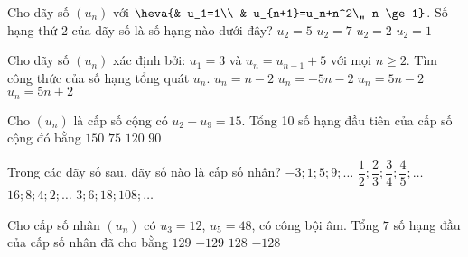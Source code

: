 \begin{ex}%
Cho dãy số $\left(u_n\right)$ với $\heva{& u_1=1\\ & u_{n+1}=u_n+n^2\,, n \ge 1}$. Số hạng thứ $2$ của dãy số là số hạng nào dưới đây?
\choice
{$u_2=5$}
{$u_2=7$}
{\True $u_2=2$}
{$u_2=1$}
\end{ex}

\begin{ex}%
Cho dãy số $(u_n)$ xác định bởi: $u_1=3$ và  $u_n = u_{n-1}+5$ với mọi $n \ge 2.$ Tìm công thức của số hạng tổng quát $u_n.$
\choice
{$u_n = n-2$}
{$u_n = -5n-2$}
{\True $u_n = 5n-2$}
{$u_n = 5n+2$}
\end{ex}

\begin{ex}%
Cho $\left(u_n\right)$ là cấp số cộng có $u_2+u_9=15$. Tổng 10 số hạng đầu tiên của cấp số cộng đó bằng
\choice
{$150$}
{\True $75$}
{$120$}
{$90$}
\end{ex}

\begin{ex}%
Trong các dãy số sau, dãy số nào là cấp số nhân?
\choice
{$-3; 1; 5; 9; \ldots$}
{$\dfrac{1}{2}; \dfrac{2}{3}; \dfrac{3}{4}; \dfrac{4}{5}; \ldots$}
{\True $16; 8; 4; 2; \ldots$}
{$3; 6; 18; 108; \ldots$}
\end{ex}

\begin{ex}%
Cho cấp số nhân $\left(u_n\right)$ có $u_3=12$, $u_5=48$, có công bội âm. Tổng $7$ số hạng đầu của cấp số nhân đã cho bằng
\choice
{\True $129$}
{$-129$}
{$128$}
{$-128$}
\end{ex}

